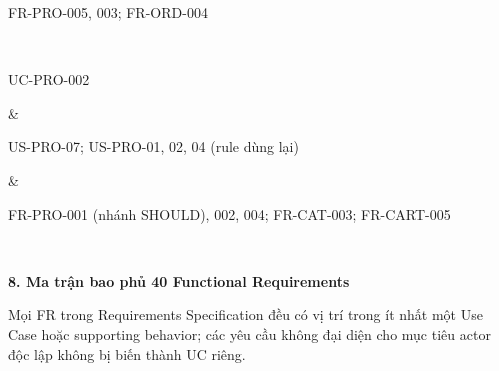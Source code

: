 \documentclass[11pt,a4paper,oneside]{report}
\begin{document}
\begin{longtable}[]
\begin{minipage}[b]{\linewidth}
FR-PRO-005, 003; FR-ORD-004
\end{minipage} \\
\begin{minipage}[b]{\linewidth}\raggedright
UC-PRO-002
\end{minipage} & \begin{minipage}[b]{\linewidth}\raggedright
US-PRO-07; US-PRO-01, 02, 04 (rule dùng lại)
\end{minipage} & \begin{minipage}[b]{\linewidth}\raggedright
FR-PRO-001 (nhánh SHOULD), 002, 004; FR-CAT-003; FR-CART-005
\end{minipage} \\
\midrule\noalign{}
\endhead
\bottomrule\noalign{}
\endlastfoot
\end{longtable}

\textbf{8. Ma trận bao phủ 40 Functional Requirements}

Mọi FR trong Requirements Specification đều có vị trí trong ít nhất một Use Case hoặc supporting behavior; các yêu cầu không đại diện cho mục tiêu actor độc lập không bị biến thành UC riêng.
\end{document}
